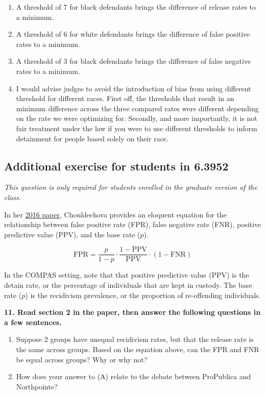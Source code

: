 \documentclass{article}
\begin{document}
\bigskip
\begin{mdframed}

\begin{enumerate}[label=\Alph*.]
\item A threshold of 7 for black defendants brings the difference of release rates to a minimum.
\item A threshold of 6 for white defendants brings the difference of false positive rates to a minimum.
\item A threshold of 3 for black defendants brings the difference of false negative rates to a minimum.
\item  I would advise judges to avoid the introduction of bias from using different threshold for different races. First off, the thresholds that result in an minimum difference across the three compared rates were different depending on the rate we were optimizing for. Secondly, and more importantly, it is not fair treatment under the law if you were to use different thresholds to inform detainment for people based solely on their race.

\end{enumerate}
\end{mdframed}
\bigskip

\subsection*{Additional exercise for students in 6.3952}

\textit{This question is only required for students enrolled in the graduate version of the class.}

In her \href{https://arxiv.org/pdf/1610.07524}{2016 paper}, Chouldechova provides an eloquent equation for the relationship between false positive rate (FPR), false negative rate (FNR), positive predictive value (PPV), and the base rate ($p$). 

$$\text{FPR} = \frac{p}{1-p} \cdot \frac{1-\text{PPV}}{\text{PPV}} \cdot (1-\text{FNR})$$

In the COMPAS setting, note that that positive predictive value (PPV) is the detain rate, or the percentage of individuals that are kept in custody. The base rate ($p$) is the recidivism prevalence, or the proportion of re-offending individuals. 

\textbf{11. Read section 2 in the paper, then answer the following questions in a few sentences.}
\begin{enumerate}[label=\Alph*.]
\item Suppose 2 groups have unequal recidivism rates, but that the release rate is the same across groups. Based on the equation above, can the FPR and FNR be equal across groups? Why or why not?
\item How does your answer to (A) relate to the debate between ProPublica and Northpointe?
\end{enumerate}
\end{document}
